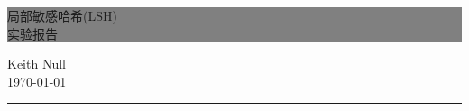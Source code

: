 \begin{titlepage} %


    \colorbox{grey}{
        \parbox[t]{0.93\textwidth}{ %
            \parbox[t]{0.91\textwidth}{ %
                \raggedleft %
                \fontsize{50pt}{80pt}\selectfont %
                \vspace{0.7cm} %

                  局部敏感哈希(LSH)\\
                  实验报告


                \vspace{0.7cm} %
            }
        }
    }

    \vfill %


    \parbox[t]{0.93\textwidth}{ %
        \raggedleft %
        \large %
        {\Large Keith Null}\\[4pt] %
        \today\\

        \hfill\rule{0.2\linewidth}{1pt}%
    }

\end{titlepage}



